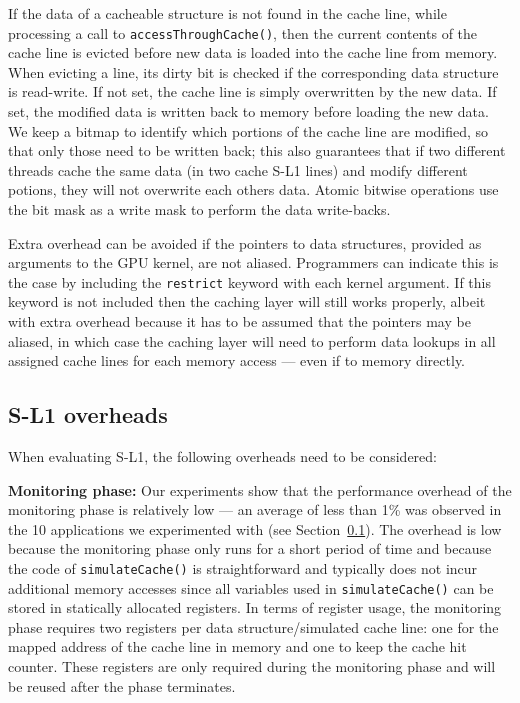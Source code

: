 If the data of a cacheable structure is not found in the cache line, while processing a call to \texttt{accessThroughCache()}, then the current contents of the cache line is evicted before new data is loaded into the cache line from memory.  
When evicting a line, its dirty bit is checked if the corresponding data structure is read-write. 
If not set, the cache line is simply overwritten by the new data.
If set, the modified data is written back to memory before loading the new data.
We keep a bitmap to identify which portions of the cache line are modified, so that only those need to be written back; 
this also guarantees that if two different threads cache the same data (in two cache S-L1 lines) and modify different potions, they will not overwrite each others data.
Atomic bitwise operations use the bit mask as a write mask to perform the data write-backs. 

Extra overhead can be avoided if the pointers to data structures, provided as arguments to the GPU kernel, are not aliased. 
Programmers can indicate this is the case by including the \texttt{restrict} keyword with each kernel argument. 
If this keyword is not included then the caching layer will still works properly, albeit 
with extra overhead because it has to be assumed that the pointers may be aliased,
in which case  the caching layer will need to perform data lookups in all assigned cache lines for each memory access --- even if to memory directly.



\subsection{S-L1 overheads}
When evaluating S-L1, the following overheads need to be considered:


\noindent
{\bf Monitoring phase:} 
Our experiments show that the performance overhead of the monitoring phase is relatively low --- an average of less than 1\% was observed in the 10  applications we experimented with (see Section~\ref{}). 
The overhead is low because the monitoring phase only runs for a short period of time and because the code of \texttt{simulateCache()} is straightforward and typically does not incur additional memory accesses since all variables used in \texttt{simulateCache()} can be stored in statically allocated registers. 
In terms of register usage, the monitoring phase requires two registers per data structure/simulated cache line: one for the mapped address of the cache line in memory and one to keep the cache hit counter. 
These registers are only required during the monitoring phase and will be reused after
the phase terminates.

